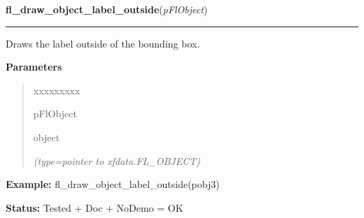\hspace{.8\funcindent}\begin{boxedminipage}{\funcwidth}

    \raggedright \textbf{fl\_draw\_object\_label\_outside}(\textit{pFlObject})

    \vspace{-1.5ex}

    \rule{\textwidth}{0.5\fboxrule}
\setlength{\parskip}{2ex}
    Draws the label outside of the bounding box.

\setlength{\parskip}{1ex}
      \textbf{Parameters}
      \vspace{-1ex}

      \begin{quote}
        \begin{Ventry}{xxxxxxxxx}

          \item[pFlObject]

          object

            {\it (type=pointer to xfdata.FL\_OBJECT)}

        \end{Ventry}

      \end{quote}

\textbf{Example:} fl\_draw\_object\_label\_outside(pobj3)



\textbf{Status:} Tested + Doc + NoDemo = OK



    \end{boxedminipage}

    \label{xformslib:flbasic:fl_draw_object_label_outside}

    \vspace{0.5ex}

